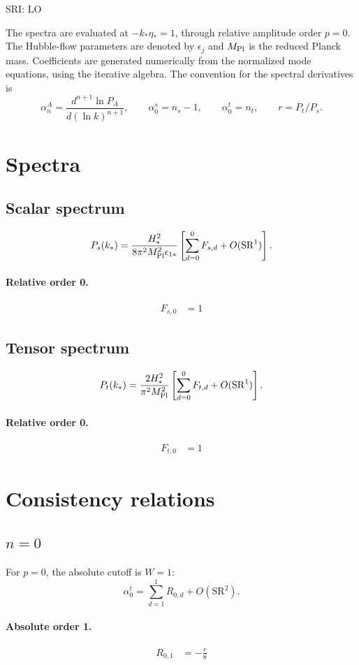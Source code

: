 \documentclass[10pt]{article}
\begin{document}
\begin{center}\Large SRI: LO\end{center}
The spectra are evaluated at $-k_*\eta_*=1$, through relative amplitude
order $p=0$. The Hubble-flow parameters are denoted by $\epsilon_j$
and $M_{\rm Pl}$ is the reduced Planck mass. Coefficients are generated
numerically from the normalized mode equations, using the iterative algebra.
The convention for the spectral derivatives is
\[
\alpha_n^A=\frac{d^{n+1}\ln P_A}{d(\ln k)^{n+1}},\qquad
\alpha_0^s=n_s-1,\qquad\alpha_0^t=n_t,\qquad r=P_t/P_s.
\]
\section{Spectra}

\subsection{Scalar spectrum}
\[P_s(k_*)=\frac{H_*^2}{8\pi^2M_{\rm Pl}^2\epsilon_{1*}}\left[\sum_{d=0}^{0}F_{s,d}+O(\mathrm{SR}^{1})\right].\]
\paragraph{Relative order 0.}
\begin{align*}
F_{s,0} &= 1
\end{align*}

\subsection{Tensor spectrum}
\[P_t(k_*)=\frac{2H_*^2}{\pi^2M_{\rm Pl}^2}\left[\sum_{d=0}^{0}F_{t,d}+O(\mathrm{SR}^{1})\right].\]
\paragraph{Relative order 0.}
\begin{align*}
F_{t,0} &= 1
\end{align*}

\section{Consistency relations}
\subsection{$n=0$}
For $p=0$, the absolute cutoff is $W=1$:
\[\alpha_{0}^t=\sum_{d=1}^{1}R_{0,d}+O(\mathrm{SR}^{2}).\]
\paragraph{Absolute order 1.}
\begin{align*}
R_{0,1} &=  - \frac{r}{8}
\end{align*}
\end{document}
